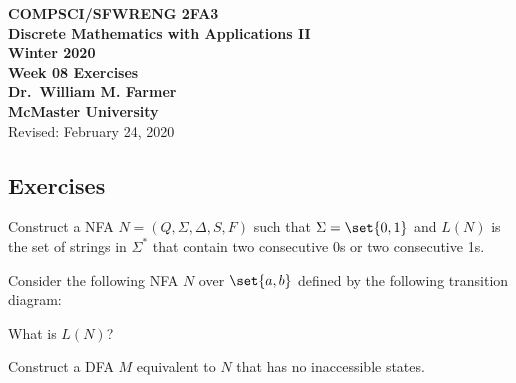 \documentclass[11pt,fleqn]{article}
\begin{document}
\bc

  {\large \textbf{COMPSCI/SFWRENG 2FA3}}\\[2mm]
  {\large \textbf{Discrete Mathematics with Applications II}}\\[2mm]
  {\large \textbf{Winter 2020}}\\[8mm]
  {\huge \textbf{Week 08 Exercises}}\\[6mm]
  {\large \textbf{Dr.~William M. Farmer}}\\[2mm]
  {\large \textbf{McMaster University}}\\[6mm]
  {\large Revised: February 24, 2020}

\ec

\medskip

\subsection*{Exercises}

\be

  \item Construct a NFA $N = (Q,\Sigma,\Delta,S,F)$ such that $\Sigma
    = \set{0,1}$ and $L(N)$ is the set of strings in $\Sigma^*$ that
    contain two consecutive 0s or two consecutive 1s.

  \item Consider the following NFA $N$ over $\set{a,b}$ defined by the
    following transition diagram:

\bc
{}
\ec

  \be

    \item What is $L(N)$?

    \item Construct a DFA $M$ equivalent to $N$ that has no
      inaccessible states.
\end{document}
